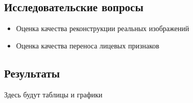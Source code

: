 \subsection{Исследовательские вопросы}
\begin{itemize}
\item Оценка качества реконструкции реальных изображений
\item Оценка качества переноса лицевых признаков
\end{itemize}


\subsection{Результаты}
Здесь будут таблицы и графики



